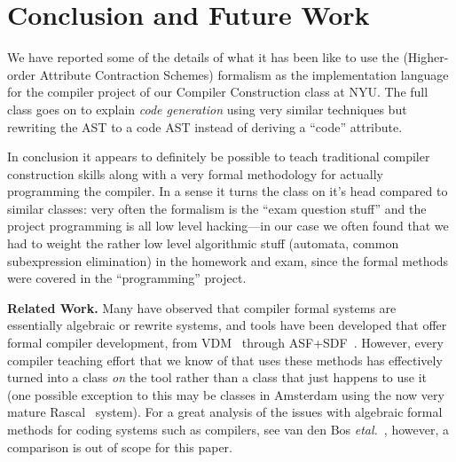 \documentclass{article}
\begin{document}
\section{Conclusion and Future Work}
\label{sec:conc}

We have reported some of the details of what it has been like to use the \HAX (Higher-order
Attribute Contraction Schemes) formalism as the implementation language for the compiler project of
our Compiler Construction class at NYU.  The full class goes on to explain \emph{code generation}
using very similar techniques but rewriting the AST to a code AST instead of deriving a ``code''
attribute.

In conclusion it appears to definitely be possible to teach traditional compiler construction skills
along with a very formal methodology for actually programming the compiler.  In a sense it turns the
class on it's head compared to similar classes: very often the formalism is the ``exam question
stuff'' and the project programming is all low level hacking---in our case we often found that we
had to weight the rather low level algorithmic stuff (automata, common subexpression elimination) in
the homework and exam, since the formal methods were covered in the ``programming'' project.

\smallskip\noindent\textbf{Related Work.}
Many have observed that compiler formal systems are essentially algebraic or rewrite systems, and
tools have been developed that offer formal compiler development, from VDM~\cite{BjornerJones:1982}
through ASF+SDF~\cite{BrandEtal:toplas2002}. However, every compiler teaching effort that we know of
that uses these methods has effectively turned into a class \emph{on} the tool rather than a class
that just happens to use it (one possible exception to this may be classes in Amsterdam using the
now very mature Rascal~\cite{KlintvandDerStormVinju:scam2009} system). For a great analysis of the
issues with algebraic formal methods for coding systems such as compilers, see van den Bos
\emph{etal.}~\cite{Bos+:eptcs2011}, however, a comparison is out of scope for this paper.


\end{document}
